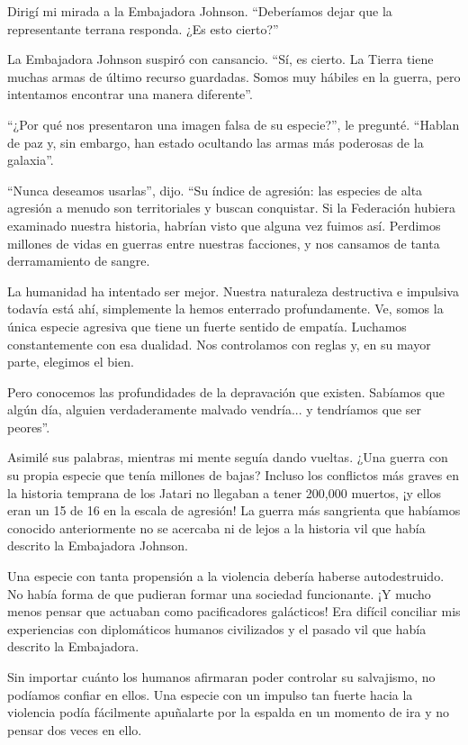 \documentclass[spanish,12pt,a4paper,oneside,titlepage]{book}
\begin{document}
    Dirigí mi mirada a la Embajadora Johnson. ``Deberíamos dejar que la representante terrana responda. ¿Es esto cierto?''

    La Embajadora Johnson suspiró con cansancio. ``Sí, es cierto. La Tierra tiene muchas armas de último recurso guardadas. Somos muy hábiles en la guerra, pero intentamos encontrar una manera diferente''.

    ``¿Por qué nos presentaron una imagen falsa de su especie?'', le pregunté. ``Hablan de paz y, sin embargo, han estado ocultando las armas más poderosas de la galaxia''.

    ``Nunca deseamos usarlas'', dijo. ``Su índice de agresión: las especies de alta agresión a menudo son territoriales y buscan conquistar. Si la Federación hubiera examinado nuestra historia, habrían visto que alguna vez fuimos así. Perdimos millones de vidas en guerras entre nuestras facciones, y nos cansamos de tanta derramamiento de sangre.

    La humanidad ha intentado ser mejor. Nuestra naturaleza destructiva e impulsiva todavía está ahí, simplemente la hemos enterrado profundamente. Ve, somos la única especie agresiva que tiene un fuerte sentido de empatía. Luchamos constantemente con esa dualidad. Nos controlamos con reglas y, en su mayor parte, elegimos el bien.

    Pero conocemos las profundidades de la depravación que existen. Sabíamos que algún día, alguien verdaderamente malvado vendría... y tendríamos que ser peores''.

    Asimilé sus palabras, mientras mi mente seguía dando vueltas. ¿Una guerra con su propia especie que tenía millones de bajas? Incluso los conflictos más graves en la historia temprana de los Jatari no llegaban a tener 200,000 muertos, ¡y ellos eran un 15 de 16 en la escala de agresión! La guerra más sangrienta que habíamos conocido anteriormente no se acercaba ni de lejos a la historia vil que había descrito la Embajadora Johnson.

    Una especie con tanta propensión a la violencia debería haberse autodestruido. No había forma de que pudieran formar una sociedad funcionante. ¡Y mucho menos pensar que actuaban como pacificadores galácticos! Era difícil conciliar mis experiencias con diplomáticos humanos civilizados y el pasado vil que había descrito la Embajadora.

    Sin importar cuánto los humanos afirmaran poder controlar su salvajismo, no podíamos confiar en ellos. Una especie con un impulso tan fuerte hacia la violencia podía fácilmente apuñalarte por la espalda en un momento de ira y no pensar dos veces en ello.
\end{document}
